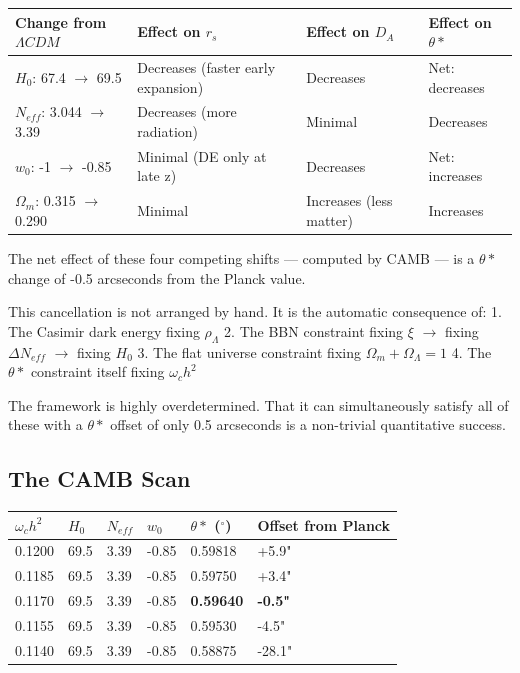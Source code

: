 \documentclass[aps,prd,preprint,superscriptaddress,longbibliography]{revtex4-2}
\begin{document}
\begin{table}[H]
\begin{ruledtabular}
\begin{tabular}{p{3.8cm}p{3.8cm}p{3.8cm}p{3.8cm}}
Change from $\Lambda CDM$ & Effect on $r_s$ & Effect on $D_A$ & Effect on $\theta*$ \\
\hline
$H_{0}$: 67.4 $\to$ 69.5 & Decreases (faster early expansion) & Decreases & Net: decreases \\
$N_{eff}$: 3.044 $\to$ 3.39 & Decreases (more radiation) & Minimal & Decreases \\
$w_{0}$: -1 $\to$ -0.85 & Minimal (DE only at late z) & Decreases & Net: increases \\
$\Omega_m$: 0.315 $\to$ 0.290 & Minimal & Increases (less matter) & Increases \\
\end{tabular}
\end{ruledtabular}
\end{table}

The net effect of these four competing shifts --- computed by CAMB --- is a $\theta*$ change of -0.5 arcseconds from the Planck value.

This cancellation is not arranged by hand. It is the automatic consequence of: 1. The Casimir dark energy fixing $\rho_\Lambda$ 2. The BBN constraint fixing $\xi$ $\to$ fixing $\Delta N_{eff}$ $\to$ fixing $H_{0}$ 3. The flat universe constraint fixing $\Omega_m + \Omega_\Lambda = 1$ 4. The $\theta*$ constraint itself fixing $\omega_c h^{2}$

The framework is highly overdetermined. That it can simultaneously satisfy all of these with a $\theta*$ offset of only 0.5 arcseconds is a non-trivial quantitative success.



\subsection{The CAMB Scan}


\begin{table}[H]
\begin{ruledtabular}
\begin{tabular}{p{2.5cm}p{2.5cm}p{2.5cm}p{2.5cm}p{2.5cm}p{2.5cm}}
$\omega_c h^{2}$ & $H_{0}$ & $N_{eff}$ & $w_{0}$ & $\theta*$ ($^{\circ}$) & Offset from Planck \\
\hline
0.1200 & 69.5 & 3.39 & -0.85 & 0.59818 & +5.9" \\
0.1185 & 69.5 & 3.39 & -0.85 & 0.59750 & +3.4" \\
0.1170 & 69.5 & 3.39 & -0.85 & \textbf{0.59640} & \textbf{-0.5"} \\
0.1155 & 69.5 & 3.39 & -0.85 & 0.59530 & -4.5" \\
0.1140 & 69.5 & 3.39 & -0.85 & 0.58875 & -28.1" \\
\end{tabular}
\end{ruledtabular}
\end{table}
\end{document}
